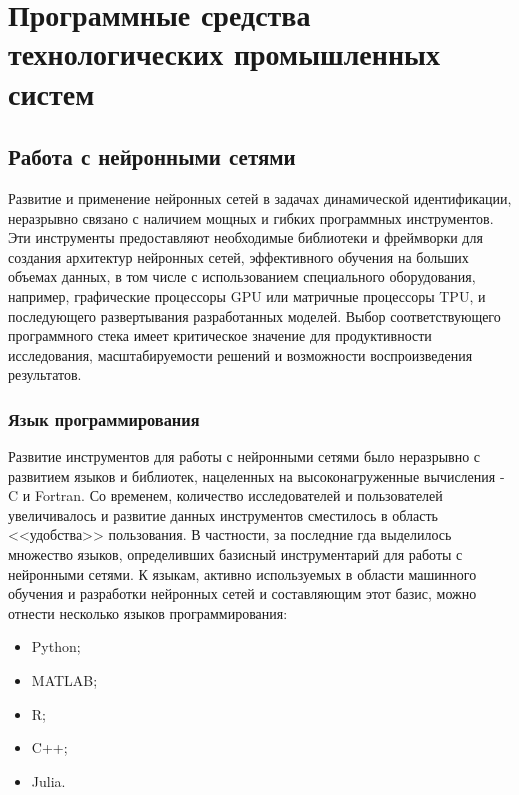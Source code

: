 \chapter{Программные средства технологических промышленных систем}



\section{Работа с нейронными сетями}

Развитие и применение нейронных сетей в задачах
динамической идентификации, неразрывно связано с
наличием мощных и гибких программных инструментов.
Эти инструменты предоставляют необходимые библиотеки
и фреймворки для создания архитектур нейронных
сетей, эффективного обучения на больших объемах
данных, в том числе с использованием специального
оборудования, например, графические процессоры GPU
или матричные процессоры TPU, и последующего
развертывания разработанных моделей. Выбор
соответствующего программного стека имеет
критическое значение для продуктивности
исследования, масштабируемости решений и возможности
воспроизведения результатов.

\subsection{Язык программирования}

Развитие инструментов для работы с нейронными сетями было неразрывно с
развитием языков и библиотек, нацеленных на высоконагруженные вычисления - C и
Fortran. Со временем, количество исследователей и пользователей увеличивалось и
развитие данных инструментов сместилось в область <<удобства>> пользования. В
частности, за последние гда выделилось множество языков, определивших базисный
инструментарий для работы с нейронными сетями. К языкам, активно используемых в
области машинного обучения и разработки нейронных сетей и составляющим этот
базис, можно отнести несколько языков программирования:

\begin{itemize}
  \item Python;
  \item MATLAB;
  \item R;
  \item C++;
  \item Julia.
\end{itemize}

